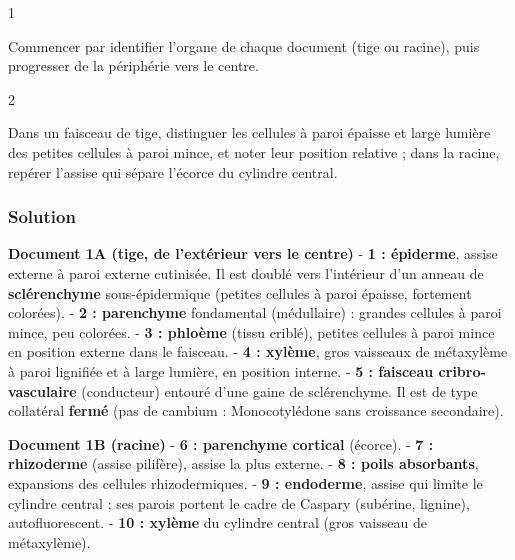 \documentclass[11pt,a4paper]{article}
\begin{document}
\begin{indication}{1}

Commencer par identifier l'organe de chaque document (tige ou racine), puis progresser de la périphérie vers le centre.

\end{indication}

\begin{indication}{2}

Dans un faisceau de tige, distinguer les cellules à paroi épaisse et large lumière des petites cellules à paroi mince, et noter leur position relative ; dans la racine, repérer l'assise qui sépare l'écorce du cylindre central.

\end{indication}

\hypertarget{solution}{%
\subsubsection{Solution}\label{solution}}

\textbf{Document 1A (tige, de l'extérieur vers le centre)}
- \textbf{1 : épiderme}, assise externe à paroi externe cutinisée. Il est doublé vers l'intérieur d'un anneau de \textbf{sclérenchyme} sous-épidermique (petites cellules à paroi épaisse, fortement colorées).
- \textbf{2 : parenchyme} fondamental (médullaire) : grandes cellules à paroi mince, peu colorées.
- \textbf{3 : phloème} (tissu criblé), petites cellules à paroi mince en position externe dans le faisceau.
- \textbf{4 : xylème}, gros vaisseaux de métaxylème à paroi lignifiée et à large lumière, en position interne.
- \textbf{5 : faisceau cribro-vasculaire} (conducteur) entouré d'une gaine de sclérenchyme. Il est de type collatéral \textbf{fermé} (pas de cambium : Monocotylédone sans croissance secondaire).

\textbf{Document 1B (racine)}
- \textbf{6 : parenchyme cortical} (écorce).
- \textbf{7 : rhizoderme} (assise pilifère), assise la plus externe.
- \textbf{8 : poils absorbants}, expansions des cellules rhizodermiques.
- \textbf{9 : endoderme}, assise qui limite le cylindre central ; ses parois portent le cadre de Caspary (subérine, lignine), autofluorescent.
- \textbf{10 : xylème} du cylindre central (gros vaisseau de métaxylème).
\end{document}
